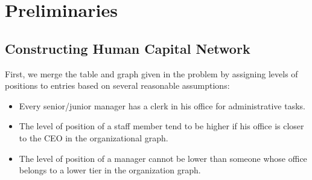 \documentclass[tcn = 37075, sheet = false, abstract = false]{mcmthesis}
\begin{document}
\section{Preliminaries}

\subsection{Constructing Human Capital Network}

First, we merge the table and graph given in the problem by assigning levels of positions to entries  based on several reasonable assumptions:

\begin{itemize}
\item Every senior/junior manager has a clerk in his office for administrative tasks.
\item The level of position of a staff member tend to be higher if his office is closer to the CEO in the organizational graph.
\item The level of position of a manager cannot be lower than someone whose office belongs to a lower tier in the organization graph.
\end{itemize}
\end{document}
